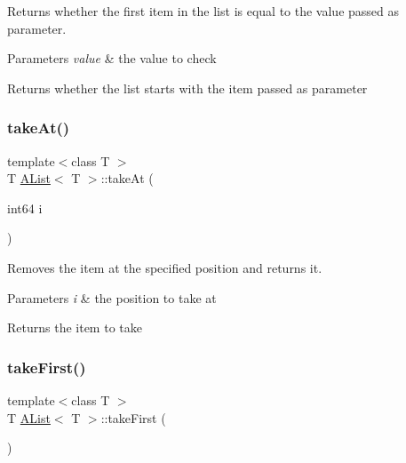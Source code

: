 Returns whether the first item in the list is equal to the value passed as parameter. 


\begin{DoxyParams}{Parameters}
{\em value} & the value to check \\
\hline
\end{DoxyParams}
\begin{DoxyReturn}{Returns}
whether the list starts with the item passed as parameter 
\end{DoxyReturn}
\mbox{\label{class_a_list_a626da346e2e3fdbc42f14fa11926f79c}} 
\subsubsection{\texorpdfstring{takeAt()}{takeAt()}}
{\footnotesize\ttfamily template$<$class T $>$ \\
T \mbox{\hyperlink{class_a_list}{A\+List}}$<$ T $>$\+::take\+At (\begin{DoxyParamCaption}\item[{int64}]{i }\end{DoxyParamCaption})}



Removes the item at the specified position and returns it. 


\begin{DoxyParams}{Parameters}
{\em i} & the position to take at \\
\hline
\end{DoxyParams}
\begin{DoxyReturn}{Returns}
the item to take 
\end{DoxyReturn}
\mbox{\label{class_a_list_af2da906ed8c9bf282fc9f6f726864d9f}} 
\subsubsection{\texorpdfstring{takeFirst()}{takeFirst()}}
{\footnotesize\ttfamily template$<$class T $>$ \\
T \mbox{\hyperlink{class_a_list}{A\+List}}$<$ T $>$\+::take\+First (\begin{DoxyParamCaption}{ }\end{DoxyParamCaption})}



